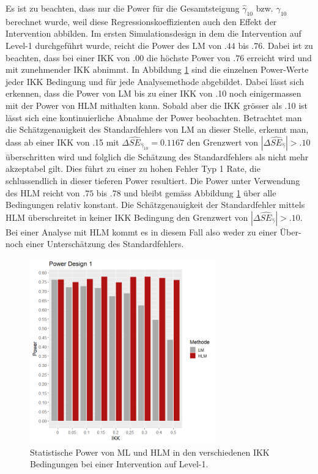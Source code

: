 \documentclass[12pt]{article}\usepackage[]{graphicx}\usepackage[]{color}
\begin{document}
Es ist zu beachten, dass nur die Power für die Gesamtsteigung $\widehat{\gamma}_{10}$ bzw. $\widehat{\gamma}_{10}$ berechnet wurde, weil diese Regressionskoeffizienten auch den Effekt der Intervention abbilden. Im ersten Simulationsdesign in dem die Intervention auf Level-1 durchgeführt wurde, reicht die Power des LM von $.44$ bis $.76$. Dabei ist zu beachten, dass bei einer IKK von .00 die höchste Power von $.76$ erreicht wird und mit zunehmender IKK abnimmt. In Abbildung \ref{fig:power_design1} sind die einzelnen Power-Werte jeder IKK Bedingung und für jede Analysemethode abgebildet. Dabei lässt sich erkennen, dass die Power von LM bis zu einer IKK von .10 noch einigermassen mit der Power von HLM mithalten kann. Sobald aber die IKK grösser als .10 ist lässt sich eine kontinuierliche Abnahme der Power beobachten. Betrachtet man die Schätzgenauigkeit des Standardfehlers von LM an dieser Stelle, erkennt man, dass ab einer IKK von .15 mit $\Delta\widehat{SE}_{\widehat{\gamma}_{10}} = 0.1167$ den Grenzwert von $|\Delta\widehat{SE}_{\widehat{\gamma}}| > .10$ \citep{hooglandboosma1998robustness} überschritten wird und folglich die Schätzung des Standardfehlers als nicht mehr akzeptabel gilt. Dies führt zu einer zu hohen Fehler Typ 1 Rate, die schlussendlich  in dieser tieferen Power resultiert. Die Power unter Verwendung des HLM reicht von $.75$ bis $.78$ und bleibt gemäss Abbildung \ref{fig:power_design1} über alle Bedingungen relativ konstant. Die Schätzgenauigkeit der Standardfehler mittels HLM überschreitet in keiner IKK Bedingung den Grenzwert von $|\Delta\widehat{SE}_{\widehat{\gamma}}| > .10$. Bei einer Analyse mit HLM kommt es in diesem Fall also weder zu einer Über- noch einer Unterschätzung des Standardfehlers.
\begin{figure}[t!]
\centering
\captionsetup{width=8cm}
\includegraphics[width=8cm, height=8cm]{power_design1}
\caption{Statistische Power von ML und HLM in den verschiedenen IKK Bedingungen bei einer Intervention auf Level-1.}
\label{fig:power_design1}
\end{figure}
\end{document}
